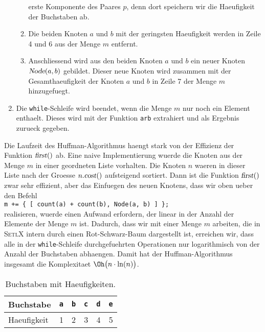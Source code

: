 \begin{enumerate}
\begin{enumerate}
            erste Komponente des Paares $p$, denn dort speichern wir die Haeufigkeit der Buchstaben 
            ab.
      \item Die beiden Knoten $a$ und $b$ mit der geringsten Haeufigkeit werden in Zeile 4 und 6
            aus der Menge $m$ entfernt.
      \item Anschliessend wird aus den beiden Knoten $a$ und $b$ ein neuer Knoten 
            $\textsl{Node}(a,b)$ gebildet.
            Dieser neue Knoten wird zusammen mit der Gesamthaeufigkeit der Knoten $a$ und $b$ in Zeile
            7 der Menge $m$ hinzugefuegt.
      \end{enumerate}
\item Die \texttt{while}-Schleife wird beendet, wenn die Menge $m$ nur noch ein Element enthaelt.
      Dieses wird mit der Funktion \texttt{arb} extrahiert und als Ergebnis zurueck gegeben.
\end{enumerate}
Die Laufzeit des Huffman-Algorithmus haengt stark von der Effizienz der Funktion $\textsl{first}()$ ab.
Eine naive Implementierung wuerde die Knoten aus der Menge $m$ in einer geordneten Liste vorhalten.
Die Knoten $n$ waeren in dieser Liste nach der Groesse $n.\textsl{cost}()$ aufsteigend sortiert.
Dann ist die Funktion $\textsl{first}()$ zwar sehr effizient, aber das Einfuegen des neuen Knotens,
dass wir oben ueber den Befehl 
\\[0.2cm]
\hspace*{1.3cm}
\texttt{m += \{ [ count(a) + count(b), Node(a, b) ] \};}
\\[0.2cm]
realisieren,  wuerde einen Aufwand erfordern, der linear in der Anzahl der Elemente der Menge $m$ ist.
Dadurch, dass wir mit einer Menge  $m$ arbeiten, die in \textsc{SetlX} intern durch einen
Rot-Schwarz-Baum dargestellt ist, erreichen wir, dass alle in der \texttt{while}-Schleife durchgefuehrten
Operationen nur logarithmisch von der Anzahl der Buchstaben abhaengen.  Damit hat der Huffman-Algorithmus
insgesamt die Komplexitaet $\Oh\bigl(n \cdot \ln(n)\bigr)$.
 

\begin{table}[htbp]
  \centering
\begin{tabular}[t]{|l|r|r|r|r|r|}
\hline
Buchstabe  & \texttt{a} & \texttt{b} & \texttt{c} & \texttt{d} & \texttt{e} \\
\hline
Haeufigkeit &          1 &          2 &          3 &          4 &          5 \\
\hline
\end{tabular}
  \caption{Buchstaben mit Haeufigkeiten.}
  \label{tab:frequency}
\end{table}

